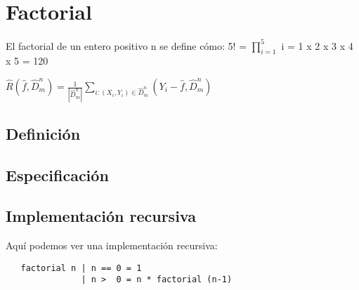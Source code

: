 \documentclass{article}
\begin{document}
\section{Factorial}


El factorial de un entero positivo n se define cómo: 5! = $\prod_{i=1}^{5}$ i = 1 x 2 x 3 x 4 x 5 = 120 


$\hat{R}(\hat{f}, \hat{D}_m^n ) = \frac{1}{|\hat{D}_m^n|} \sum_{i:(X_i, Y_i) \in \hat{D}_m^n }^{} (Y_i - \hat{f}, \hat{D}_m^n) $

\subsection{Definición}



\subsection{Especificación}


\subsection{Implementación recursiva}

Aquí podemos ver una implementación recursiva:

\begin{verbatim}
   factorial n | n == 0 = 1
               | n >  0 = n * factorial (n-1)
\end{verbatim}
\end{document}
